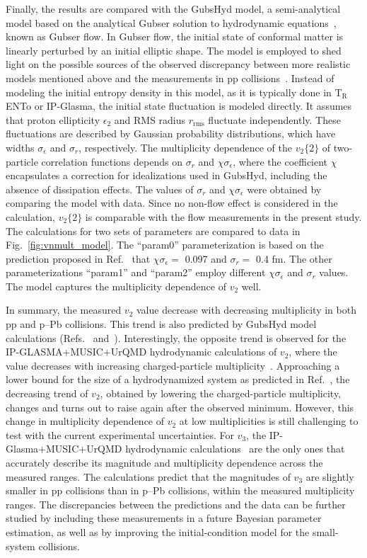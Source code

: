 Finally, the results are compared with the GubsHyd model, a semi-analytical model based on the analytical Gubser solution to hydrodynamic equations~\cite{Gubser:2010ze,Gubser:2010ui}, known as Gubser flow. In Gubser flow, the initial state of conformal matter is linearly perturbed by an initial elliptic shape. The model is employed to shed light on the possible sources of the observed discrepancy between more realistic models mentioned above and the measurements in pp collisions~\cite{Taghavi:2019mqz}. Instead of modeling the initial entropy density in this model, as it is typically done in T$_{\text{R}}$ENTo or IP-Glasma, the initial state fluctuation is modeled directly. It assumes that proton ellipticity $\epsilon_{2}$ and RMS radius $r_{\text{rms}}$ fluctuate independently. These fluctuations are described by Gaussian probability distributions, which have widths $\sigma_{\epsilon}$
 and $\sigma_{r}$, respectively. The multiplicity dependence of the $v_2\{2\}$ of two-particle correlation functions depends on $\sigma_{r}$ and  $\chi\sigma_{\epsilon}$, where the coefficient $\chi$ encapsulates a correction for idealizations used in GubsHyd, including the absence of dissipation effects. The values of $\sigma_{r}$ and  $\chi\sigma_{\epsilon}$ were obtained by comparing the model with data. Since no non-flow effect is considered in the calculation, $v_2\{2\}$ is comparable with the flow measurements in the present study. The calculations for two sets of parameters are compared
to data in Fig.~\ref{fig:vnmult_model}. The “param0” parameterization is based on the prediction proposed in Ref.~\cite{Taghavi:2019mqz} that $\chi \sigma_{\epsilon} =$ 0.097 and $\sigma_{r} =$ 0.4 fm. The other parameterizations “param1” and “param2” employ different $\chi \sigma_{\epsilon}$  and $\sigma_{r}$ values. The model captures the multiplicity dependence of $v_2$ well.

In summary, the measured $v_{2}$ value decrease with decreasing multiplicity in both pp and p--Pb collisions. This trend is also predicted by GubsHyd model calculations (Refs.~\cite{Taghavi:2019mqz} and~\cite{Weller:2017tsr}). Interestingly, the opposite trend is observed for the IP-GLASMA+MUSIC+UrQMD hydrodynamic calculations of $v_2$, where the value decreases with increasing charged-particle multiplicity~\cite{Schenke:2020mbo}.
Approaching a lower bound for the size of a hydrodynamized
system as predicted in Ref.~\cite{Taghavi:2019mqz}, 
the decreasing trend of $v_2$, obtained by lowering the charged-particle multiplicity, changes and turns out to raise again after the observed minimum. However, this change in multiplicity dependence of $v_2$ at low multiplicities is still challenging to test with the current experimental uncertainties. For $v_3$, the IP-Glasma+MUSIC+UrQMD hydrodynamic calculations~\cite{Schenke:2020mbo} are the only ones that accurately describe its magnitude and multiplicity dependence across the measured ranges. The calculations predict that the magnitudes of $v_3$ are slightly smaller in pp collisions than in p--Pb collisions, within the measured multiplicity ranges. The discrepancies between the predictions and the data can be further studied by including these measurements in a future Bayesian parameter estimation, as well as by improving the initial-condition model for the small-system collisions.
